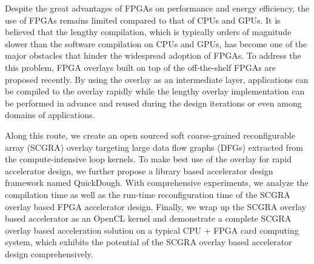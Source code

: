 Despite the great advantages of FPGAs on performance and energy efficiency,
the use of FPGAs remains limited compared to that of CPUs and GPUs. 
It is believed that the lengthy compilation, which is typically orders of 
magnitude slower than the software compilation on CPUs and GPUs, has become 
one of the major obstacles that hinder the widespread adoption of FPGAs.   
To address the this problem, FPGA overlays built on top of the off-the-shelf 
FPGAs are proposed recently. By using the overlay as an intermediate layer, 
applications can be compiled to the overlay rapidly while the lengthy overlay 
implementation can be performed in advance and reused during the design 
iterations or even among domains of applications. 

Along this route, we create an open sourced soft coarse-grained reconfigurable array (SCGRA) 
overlay targeting large data flow graphs (DFGs) extracted 
from the compute-intensive loop kernels. To make best use of the overlay for rapid 
accelerator design, we further propose a library based accelerator design 
framework named QuickDough. With comprehensive experiments, we analyze the 
compilation time as well as the run-time reconfiguration time of the 
SCGRA overlay based FPGA accelerator design. Finally,  
we wrap up the SCGRA overlay based accelerator as an OpenCL kernel 
and demonstrate a complete SCGRA overlay based acceleration solution 
on a typical CPU + FPGA card computing system, which exhibits the potential 
of the SCGRA overlay based accelerator design comprehensively. 

